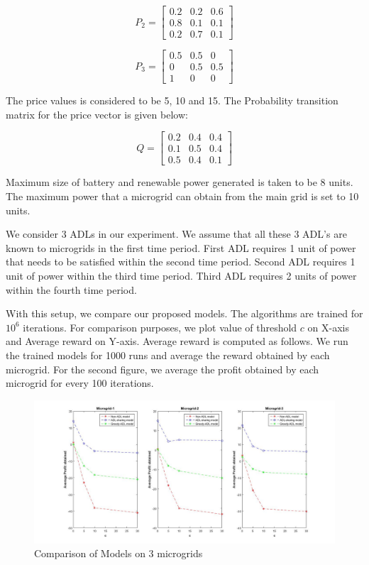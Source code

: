 \[
P_{2}=
\begin{bmatrix}
0.2 & 0.2 & 0.6 \\
0.8 & 0.1 & 0.1 \\
0.2 & 0.7 & 0.1
\end{bmatrix}
\]

\[
P_{3}=
\begin{bmatrix}
0.5 & 0.5 & 0 \\
0 & 0.5 & 0.5 \\
1 & 0 & 0
\end{bmatrix}
\]




The price values is considered to be 5, 10 and 15. The Probability transition matrix for the price vector is given below:



\[
Q=
\begin{bmatrix}
0.2 & 0.4 & 0.4 \\
0.1 & 0.5 & 0.4 \\
0.5 & 0.4 & 0.1
\end{bmatrix}
\]


Maximum size of battery and renewable power generated is taken to be 8 units. The maximum power that a microgrid can obtain from the main grid is set to 10 units.

We consider 3 ADLs in our experiment. We assume that all these 3 ADL's are known to microgrids in the first time period. First ADL requires 1 unit of power that needs to be satisfied within the second time period. Second ADL requires 1 unit of power within the third time period. Third ADL requires 2 units of power within the fourth time period.

With this setup, we compare our proposed models. The algorithms are trained for $10^6$ iterations. For comparison purposes, we plot value of threshold $c$ on X-axis and Average reward on Y-axis. Average reward is computed as follows. We run the trained models for 1000 runs and average the reward obtained by each microgrid. For the second figure, we average the profit obtained by each microgrid for every 100 iterations.

\begin{figure}[thbp] \label{r1}
	\centering
	\includegraphics[scale = 0.2]{first_plot.jpg}
	\caption{Comparison of Models on 3 microgrids}
\end{figure}

